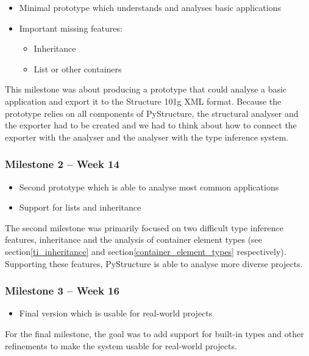 \documentclass[12pt,halfparskip,DIV11,BCOR10mm]{scrreprt}
\begin{document}
\begin{itemize}
    \item Minimal prototype which understands and analyses basic applications
    \item Important missing features:
    \begin{itemize}
        \item Inheritance
        \item List or other containers
    \end{itemize}
\end{itemize}

This milestone was about producing a prototype that could analyse a basic application and export it to the Structure 101g XML format. Because the prototype relies on all components of PyStructure, the structural analyser and the exporter had to be created and we had to think about how to connect the exporter with the analyser and the analyser with the type inference system.

\subsubsection{Milestone 2 – Week 14}

\begin{itemize}
    \item Second prototype which is able to analyse most common applications
    \item Support for lists and inheritance
\end{itemize}

The second milestone was primarily focused on two difficult type inference features, inheritance and the analysis of container element types (see section\vref{ti_inheritance} and section\vref{container_element_types} respectively). Supporting these features, PyStructure is able to analyse more diverse projects.

\subsubsection{Milestone 3 – Week 16}

\begin{itemize}
    \item Final version which is usable for real-world projects
\end{itemize}

For the final milestone, the goal was to add support for built-in types and other refinements to make the system usable for real-world projects.
\end{document}
